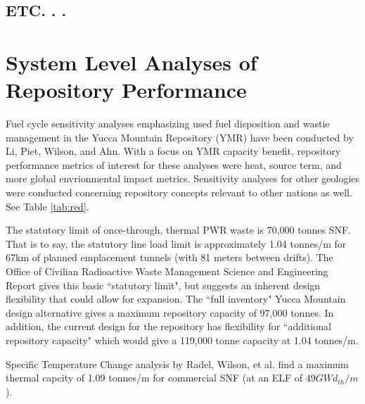 \subsection{ETC. . . }




\section{System Level Analyses of Repository Performance} 

Fuel cycle sensitivity analyses emphasizing used fuel disposition and 
wastie management in the Yucca Mountain Repository (YMR) have been 
conducted by Li, Piet, Wilson, and Ahn. With a focus on YMR capacity 
benefit, repository performance metrics of interest for these analyses 
were heat, source term, and more global envrionmental impact metrics.  
Sensitivity analyses for other geologies were conducted concerning 
repository concepts relevant to other nations as well. See Table 
\ref{tab:red}.









The statutory limit of once-through, thermal PWR waste is 70,000 
tonnes SNF. That is to say, the statutory line load limit is 
approximately 1.04 tonnes/m for 67km of planned emplacement tunnels 
(with 81 meters between drifts). The Office of Civilian Radioactive 
Waste Management Science and Engineering Report gives this basic 
``statutory limit", but suggests an inherent design flexibility that 
could allow for expansion. The ``full inventory" Yucca Mountain design 
alternative gives a maximum repository capacity of 97,000 tonnes. In 
addition, the current design for the repository has flexibility for 
``additional repository capacity" which would give a 119,000 tonne 
capacity at 1.04 tonnes/m.\cite{ doe_yucca_2002}

Specific Temperature Change analysis by Radel, Wilson, et al. find a 
maximum thermal capcity of 1.09 tonnes/m for commercial SNF (at an ELF 
of $49 GWd_{th}/m$).\cite{radel_effect_2007} 

